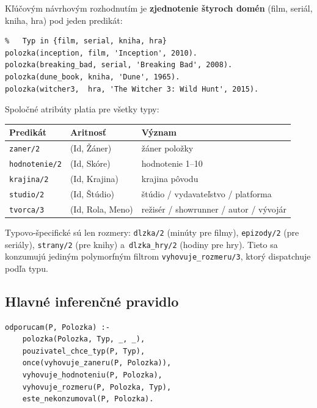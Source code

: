 \documentclass[11pt,a4paper]{article}
\begin{document}
Kľúčovým návrhovým rozhodnutím je \textbf{zjednotenie štyroch
domén} (film, seriál, kniha, hra) pod jeden predikát:

\begin{lstlisting}[caption={Reprezentácia položiek}]
% polozka(+Id, +Typ, +Nazov, +Rok)
%   Typ in {film, serial, kniha, hra}
polozka(inception, film, 'Inception', 2010).
polozka(breaking_bad, serial, 'Breaking Bad', 2008).
polozka(dune_book, kniha, 'Dune', 1965).
polozka(witcher3,  hra, 'The Witcher 3: Wild Hunt', 2015).
\end{lstlisting}

Spoločné atribúty platia pre všetky typy:

\begin{center}
\begin{tabular}{lll}
\toprule
\textbf{Predikát} & \textbf{Aritnosť} & \textbf{Význam}\\
\midrule
\texttt{zaner/2}       & (Id, Žáner)       & žáner položky\\
\texttt{hodnotenie/2} & (Id, Skóre)       & hodnotenie 1--10\\
\texttt{krajina/2}    & (Id, Krajina)     & krajina pôvodu\\
\texttt{studio/2}     & (Id, Štúdio)      & štúdio / vydavateľstvo / platforma\\
\texttt{tvorca/3}     & (Id, Rola, Meno)  & režisér / showrunner / autor / vývojár\\
\bottomrule
\end{tabular}
\end{center}

Typovo-špecifické sú len rozmery: \texttt{dlzka/2} (minúty
pre filmy), \texttt{epizody/2} (pre seriály), \texttt{strany/2}
(pre knihy) a~\texttt{dlzka\_hry/2} (hodiny pre hry). Tieto sa konzumujú jediným polymorfným
filtrom \texttt{vyhovuje\_rozmeru/3}, ktorý dispatchuje podľa
typu.

\subsection{Hlavné inferenčné pravidlo}

\begin{lstlisting}
odporucam(P, Polozka) :-
    polozka(Polozka, Typ, _, _),
    pouzivatel_chce_typ(P, Typ),
    once(vyhovuje_zaneru(P, Polozka)),
    vyhovuje_hodnoteniu(P, Polozka),
    vyhovuje_rozmeru(P, Polozka, Typ),
    este_nekonzumoval(P, Polozka).
\end{lstlisting}
\end{document}
